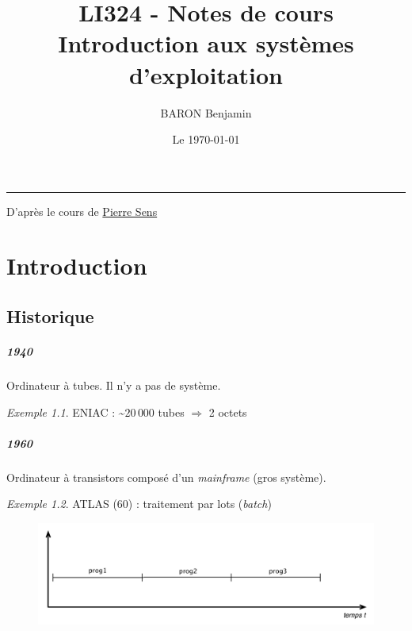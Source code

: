 \documentclass[11pt,english,french]{scrreprt}
\makeatletter
\theoremstyle{remark}
\newtheorem*{ex*}{Exemple}
\theoremstyle{definition}
\def\thickhrulefill{\leavevmode \leaders \hrule height 1pt\hfill \kern \z@}
\def\maketitle{%
  \null
  \thispagestyle{empty}%
  \vfill
  \begin{center}\leavevmode
    \normalfont
    {\huge \sffamily \bfseries\color{orange}\raggedright \@title\par}%
    \thickhrulefill\par
    {\large\sffamily\color{MyDarkBlue}\raggedleft \@author\par}%
    \vskip 1cm
    {\Large \sffamily \@date\par}%
	{\Large \sffamily \@blurb\par}%
  \end{center}%
  \vfill
  \null
  \cleardoublepage
  }
\def\blurb#1{\def\@blurb{#1}}
\makeatother
\begin{document}
\author{BARON Benjamin}
\date{Le \today}
\blurb{D'après le cours de \href{http://pagesperso-systeme.lip6.fr/Pierre.Sens/}{Pierre Sens}}

\title{LI324 - Notes de cours\\
Introduction aux systèmes d'exploitation}

\maketitle
\renewcommand\contentsname{\vspace{-30pt}Table des matières\vspace{-30pt}} 
\tableofcontents

\chapter{Introduction} %

\section{Historique} %

\paragraph{1940} %
Ordinateur à tubes. Il n'y a pas de système. 
\begin{ex*}
	ENIAC : \textasciitilde $20\,000$ tubes $\Rightarrow$ 2 octets
\end{ex*}

\paragraph{1960} %
Ordinateur à transistors composé d'un \emph{mainframe} (gros système).
\begin{ex*}
	ATLAS (60) : traitement par lots (\emph{batch})
\end{ex*}
\begin{figure}[h!]
	\center
	\includegraphics[scale=.6]{img/batch}
\end{figure}
\end{document}
